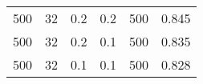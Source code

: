 \begin{table}[H]
\begin{tabular}{c|c|c|c|r|c}
    500                                & 32                             & 0.2                         & 0.2                                  & 500                                 & 0.845                  \\
    500                                & 32                             & 0.2                         & 0.1                                  & 500                                 & 0.835                  \\
    500                                & 32                             & 0.1                         & 0.1                                  & 500                                 & 0.828                  \\ 
    \hline               
    \end{tabular}
\end{table}
